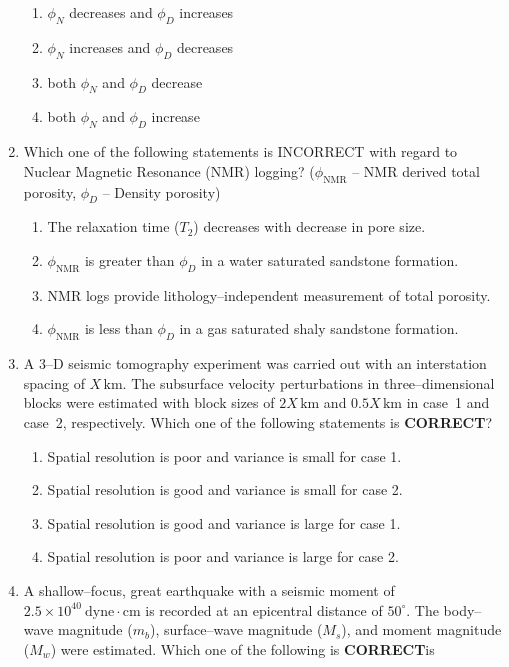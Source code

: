 \documentclass[journal,12pt,onecolumn]{IEEEtran}
\theoremstyle{remark}
\begin{document}
\begin{enumerate}
\begin{enumerate}
\item $\phi_N$ decreases and $\phi_D$ increases
\item $\phi_N$ increases and $\phi_D$ decreases
\item both $\phi_N$ and $\phi_D$ decrease
\item both $\phi_N$ and $\phi_D$ increase
\end{enumerate}

\item Which one of the following statements is INCORRECT with regard to Nuclear Magnetic Resonance (NMR) logging? ($\phi_{\mathrm{NMR}}$ -- NMR derived total porosity, $\phi_D$ -- Density porosity)
\begin{enumerate}
\item The relaxation time ($T_2$) decreases with decrease in pore size.
\item $\phi_{\mathrm{NMR}}$ is greater than $\phi_D$ in a water saturated sandstone formation.
\item NMR logs provide lithology--independent measurement of total porosity.
\item $\phi_{\mathrm{NMR}}$ is less than $\phi_D$ in a gas saturated shaly sandstone formation.
\end{enumerate}

\item A 3--D seismic tomography experiment was carried out with an  interstation spacing of $X\,\mathrm{km}$. The subsurface velocity perturbations  in three--dimensional blocks were estimated with block sizes of $2X\,\mathrm{km}$  and $0.5X\,\mathrm{km}$ in case~1 and case~2, respectively. Which one of the 
following statements is \textbf{CORRECT}?


\begin{enumerate}
\item Spatial resolution is poor and variance is small for case 1.
\item Spatial resolution is good and variance is small for case 2.
\item Spatial resolution is good and variance is large for case 1.
\item Spatial resolution is poor and variance is large for case 2.
\end{enumerate}

\item A shallow--focus, great earthquake with a seismic moment of  $2.5 \times 10^{40}\ \mathrm{dyne\! \cdot\! cm}$ is recorded at an epicentral  distance of $50^{\circ}$. The body--wave magnitude ($m_b$),  surface--wave magnitude ($M_s$), and moment magnitude ($M_w$) were  estimated. Which one of the following is \textbf{CORRECT}is


\end{enumerate}
\end{document}
